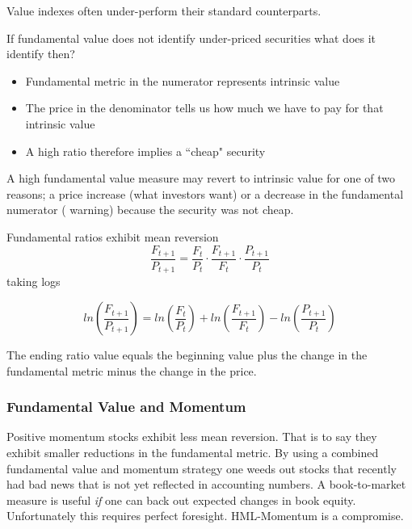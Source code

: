 Value indexes often under-perform their standard counterparts.

If fundamental value does not identify under-priced securities what does it 
identify then?
\begin{itemize}
  \item Fundamental metric in the numerator represents intrinsic value
  \item The price in the denominator tells us how much we have to pay for that 
  intrinsic value
  \item A high ratio therefore implies a ``cheap" security
\end{itemize}
A high fundamental value measure may revert to intrinsic value for one of two 
reasons;
a price increase (what investors want) or
a decrease in the fundamental numerator (\textcite{graham1934security} 
warning) 
because the security was not cheap.

Fundamental ratios exhibit mean reversion
\[
\frac{F_{t+1}}{P_{t+1}}=\frac{F_t}{P_t}\cdot\frac{F_{t+1}}{F_t}\cdot\frac{P_{t+1}}{P_t}
\]
taking logs

\[
ln\left(\frac{F_{t+1}}{P_{t+1}}\right) =ln\left(\frac{F_t}{P_t}\right) 
+ln\left(\frac{F_{t+1}}{F_t}\right) -ln\left(\frac{P_{t+1}}{P_t}\right)
\]

The ending ratio value equals the beginning value plus the change in the 
fundamental metric minus the change in the price.

\subsubsection{Fundamental Value and Momentum}

Positive momentum stocks exhibit less mean reversion.
That is to say they exhibit smaller reductions in the fundamental metric.
By using a combined fundamental value and momentum strategy one weeds out 
stocks that recently had bad news that is not yet reflected in accounting 
numbers.
A book-to-market measure is useful \emph{if} one can back out expected changes 
in book equity.
Unfortunately this requires perfect foresight.
HML-Momentum is a compromise.
